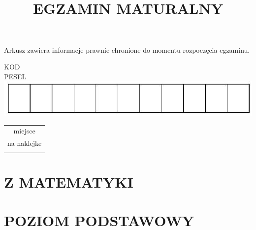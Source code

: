\documentclass[10pt]{article}
\title{EGZAMIN MATURALNY }
\author{}
\date{}
\begin{document}
\maketitle
Arkusz zawiera informacje prawnie chronione do momentu rozpoczęcia egzaminu.

KOD\\
PESEL\\
\includegraphics[max width=\textwidth, center]{2024_11_21_9383c97fb44abf35abe9g-01}

\begin{center}
\begin{tabular}{c}
 \\
miejsce \\
na naklejke \\
 \\
\hline
\end{tabular}
\end{center}

\section*{Z MATEMATYKI}
\section*{POZIOM PODSTAWOWY}
\end{document}
